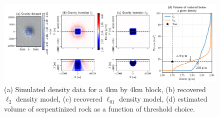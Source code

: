 \begin{figure}[!htb]
    \begin{center}
    \includegraphics[width=1\textwidth]{figures/one-block-gravity.png}
    \end{center}
\caption{
    (a) Simulated density data for a 4km by 4km block, (b) recovered $\ell_2$ density model, (c) recovered $\ell_{01}$ density model, (d) estimated volume of serpentinized rock as a function of threshold choice.
}
\label{fig:one-block-gravity}
\end{figure}

